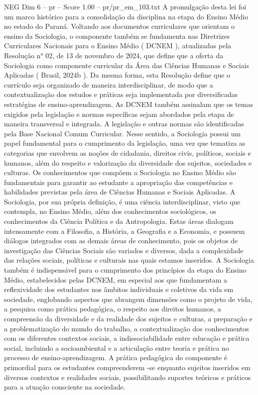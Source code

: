 \begin{textsample}{NEG Dim 6 – pr – Score 1.00 – pr/pr\_em\_103.txt}
A promulgação desta lei foi um marco histórico para a consolidação da disciplina na etapa do Ensino Médio no estado do Paraná.
Voltando aos documentos curriculares que orientam o ensino da Sociologia, o componente também se fundamenta nas Diretrizes Curriculares Nacionais para o Ensino Médio ( DCNEM ), atualizadas pela Resolução n{\EmojiFont °} 02, de 13 de novembro de 2024, que define que a oferta da Sociologia como componente curricular da Área das Ciências Humanas e Sociais Aplicadas ( Brasil, 2024b ).
Da mesma forma, esta Resolução define que o currículo seja organizado de maneira interdisciplinar, de modo que a contextualização dos estudos e práticas seja implementada por diversificadas estratégias de ensino-aprendizagem.
As DCNEM também assinalam que os temas exigidos pela legislação e normas específicas sejam abordados pela etapa de maneira transversal e integrada.
A legislação e outras normas são identificadas pela Base Nacional Comum Curricular.
Nesse sentido, a Sociologia possui um papel fundamental para o cumprimento da legislação, uma vez que tematiza as categorias que envolvem as noções de cidadania, direitos civis, políticos, sociais e humanos, além do respeito e valorização da diversidade dos sujeitos, sociedades e culturas.
Os conhecimentos que compõem a Sociologia no Ensino Médio são fundamentais para garantir ao estudante a apropriação das competências e habilidades previstas pela área de Ciências Humanas e Sociais Aplicadas.
A Sociologia, por sua própria definição, é uma ciência interdisciplinar, visto que contempla, no Ensino Médio, além dos conhecimentos sociológicos, os conhecimentos da Ciência Política e da Antropologia.
Estas áreas dialogam intensamente com a Filosofia, a História, a Geografia e a Economia, e possuem diálogos integrados com as demais áreas de conhecimento, pois os objetos de investigação das Ciências Sociais são variados e diversos, dada a complexidade das relações sociais, políticas e culturais nas quais estamos inseridos.
A Sociologia também é indispensável para o cumprimento dos princípios da etapa do Ensino Médio, estabelecidos pelas DCNEM, em especial aos que fundamentam a reflexividade dos estudantes nos âmbitos individuais e coletivos da vida em sociedade, englobando aspectos que abrangem dimensões como o projeto de vida, a pesquisa como prática pedagógica, o respeito aos direitos humanos, a compreensão da diversidade e da realidade dos sujeitos e culturas, a preparação e a problematização do mundo do trabalho, a contextualização dos conhecimentos com os diferentes contextos sociais, a indissociabilidade entre educação e prática social, incluindo a socioambiental e a articulação entre teoria e prática no processo de ensino-aprendizagem.
A prática pedagógica do componente é primordial para os estudantes compreenderem -se enquanto sujeitos inseridos em diversos contextos e realidades sociais, possibilitando suportes teóricos e práticos para a atuação consciente na sociedade.

\end{textsample}
